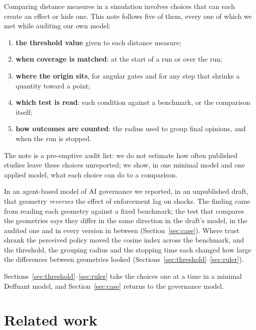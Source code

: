 \documentclass[11pt]{article}
\begin{document}
Comparing distance measures in a simulation involves choices that can each create an effect or hide one.
This note follows five of them, every one of which we met while auditing our own model:
\begin{enumerate}
\item \textbf{the threshold value} given to each distance measure;
\item \textbf{when coverage is matched}: at the start of a run or over the run;
\item \textbf{where the origin sits}, for angular gates and for any step that shrinks a quantity toward a point;
\item \textbf{which test is read}: each condition against a benchmark, or the comparison itself;
\item \textbf{how outcomes are counted}: the radius used to group final opinions, and when the run is stopped.
\end{enumerate}
The note is a pre-emptive audit list: we do not estimate how often published studies leave these choices unreported; we show, in one minimal model and one applied model, what each choice can do to a comparison.

In an agent-based model of AI governance we reported, in an unpublished draft, that geometry \emph{reverses} the effect of enforcement lag on shocks.
The finding came from reading each geometry against a fixed benchmark; the test that compares the geometries says they differ in the same direction in the draft's model, in the audited one and in every version in between (Section~\ref{sec:case}).
Where trust shrank the perceived policy moved the cosine index across the benchmark, and the threshold, the grouping radius and the stopping time each changed how large the differences between geometries looked (Sections~\ref{sec:threshold}--\ref{sec:ruler}).

Sections~\ref{sec:threshold}--\ref{sec:ruler} take the choices one at a time in a minimal Deffuant model, and Section~\ref{sec:case} returns to the governance model.

\section{Related work}
\label{sec:related}
\end{document}
